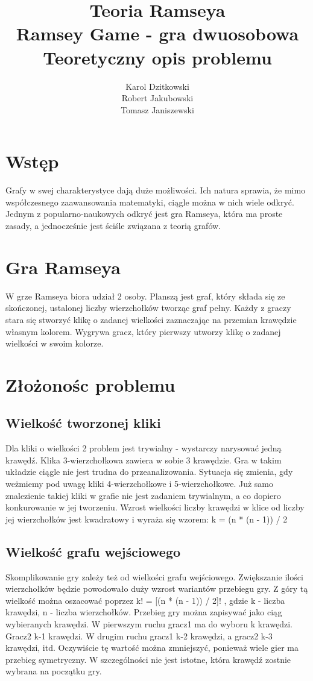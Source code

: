 \documentclass[11pt,a4paper]{article}
\author{
	Karol Dzitkowski\\
	Robert Jakubowski\\
	Tomasz Janiszewski
}
\title{
	Teoria Ramseya\\
	\huge{Ramsey Game - gra dwuosobowa}\\
	Teoretyczny opis problemu
 }
\begin{document}
\maketitle
\newpage

\tableofcontents
\newpage

\section{Wstęp}
Grafy w swej charakterystyce dają duże możliwości. Ich natura sprawia, że mimo współczesnego zaawansowania matematyki, ciągle można w nich wiele odkryć. Jednym z popularno-naukowych odkryć jest gra Ramseya, która ma proste zasady, a jednocześnie jest ściśle związana z teorią grafów.

\section{Gra Ramseya}
W grze Ramseya biora udział 2 osoby.
Planszą jest graf, który składa się ze skończonej, ustalonej liczby wierzchołków tworząc graf pełny.
Każdy z graczy stara się stworzyć klikę o zadanej wielkości zaznaczając
na przemian krawędzie własnym kolorem. Wygrywa gracz, który pierwszy utworzy klikę o zadanej wielkości w swoim kolorze.

\section{Złożonośc problemu}

\subsection{Wielkość tworzonej kliki}
Dla kliki o wielkości 2 problem jest trywialny - wystarczy narysować jedną krawędź.
Klika 3-wierzchołkowa zawiera w sobie 3 krawędzie. Gra w takim układzie ciągle nie jest trudna do przeanalizowania.
Sytuacja się zmienia, gdy weżmiemy pod uwagę kliki 4-wierzchołkowe i 5-wierzchołkowe.
Już samo znalezienie takiej kliki w grafie nie jest zadaniem trywialnym, a co dopiero konkurowanie w jej tworzeniu.
Wzrost wielkości liczby krawędzi w klice od liczby jej wierzchołków jest kwadratowy i wyraża się wzorem: k = (n * (n - 1)) / 2

\subsection{Wielkość grafu wejściowego}
Skomplikowanie gry zależy też od wielkości grafu wejściowego.
Zwiększanie ilości wierzchołków będzie powodowało duży wzrost wariantów przebiegu gry.
Z góry tą wielkość można oszacować poprzez k! = [(n * (n - 1)) / 2]!
, gdzie k - liczba krawędzi, n - liczba wierzchołków. Przebieg gry można zapisywać jako ciąg wybieranych krawędzi.
W pierwszym ruchu gracz1 ma do wyboru k krawędzi. Gracz2 k-1 krawędzi. W drugim ruchu gracz1 k-2 krawędzi, a gracz2 k-3 krawędzi, itd.
Oczywiście tę wartość można zmniejszyć, ponieważ wiele gier ma przebieg symetryczny.
W szczególności nie jest istotne, która krawędź zostnie wybrana na początku gry.
\end{document}
